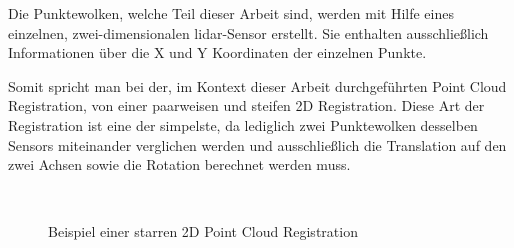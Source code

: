Die Punktewolken, welche Teil dieser Arbeit sind, werden mit Hilfe eines einzelnen, zwei-dimensionalen \ac{lidar}-Sensor erstellt.
Sie enthalten ausschließlich Informationen über die X und Y Koordinaten der einzelnen Punkte.

Somit spricht man bei der, im Kontext dieser Arbeit durchgeführten Point Cloud Registration, von einer paarweisen und steifen 2D Registration.
Diese Art der Registration ist eine der simpelste, da lediglich zwei Punktewolken desselben Sensors miteinander verglichen werden 
und ausschließlich die Translation auf den zwei Achsen sowie die Rotation berechnet werden muss.

\begin{figure}[H]
    \centering
     \\
    \caption{Beispiel einer starren 2D Point Cloud Registration}
    \label{fig:registrationExample}
\end{figure}

